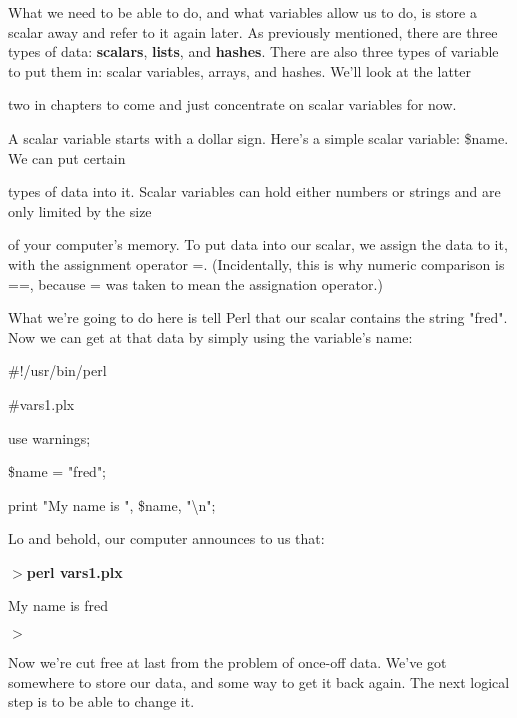 \documentclass[a4paper,11pt]{book}
\begin{document}
\noindent What we need to be able to do, and what variables allow us to do, is store a scalar away and refer to it again later. As previously mentioned, there are three types of data: \textbf{scalars}, \textbf{lists}, and \textbf{hashes}. There are also three types of variable to put them in: scalar variables, arrays, and hashes. We'll look at the latter

\noindent two in chapters to come and just concentrate on scalar variables for now.

\noindent 

\noindent A scalar variable starts with a dollar sign. Here's a simple scalar variable: \$name. We can put certain

\noindent types of data into it. Scalar variables can hold either numbers or strings and are only limited by the size

\noindent of your computer's memory. To put data into our scalar, we assign the data to it, with the assignment operator =. (Incidentally, this is why numeric comparison is ==, because = was taken to mean the assignation operator.)

\noindent 

\noindent What we're going to do here is tell Perl that our scalar contains the string "fred". Now we can get at that data by simply using the variable's name:

\noindent 

\noindent \#!/usr/bin/perl

\noindent \#vars1.plx

\noindent use warnings;

\noindent \$name = "fred";

\noindent print "My name is ", \$name, "\textbackslash n";

\noindent 

\noindent 

\noindent Lo and behold, our computer announces to us that:

\noindent 

\noindent $>$\textbf{perl vars1.plx}

\noindent My name is fred

\noindent $>$

\noindent 

\noindent Now we're cut free at last from the problem of once-off data. We've got somewhere to store our data, and some way to get it back again. The next logical step is to be able to change it.

\noindent 
\end{document}
